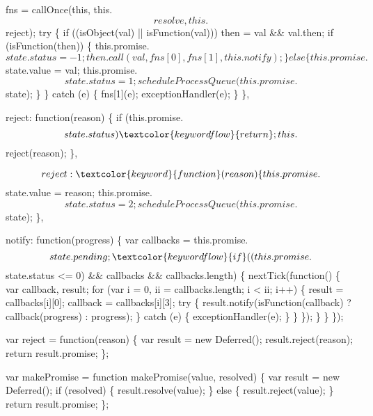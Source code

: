 \begin{DoxyCodeInclude}
{{{{      fns = callOnce(this, this.$$resolve, this.$$reject);
      try \{
        if ((isObject(val) || isFunction(val))) then = val && val.then;
        if (isFunction(then)) \{
          this.promise.$$state.status = -1;
          then.call(val, fns[0], fns[1], this.notify);
        \} else \{
          this.promise.$$state.value = val;
          this.promise.$$state.status = 1;
          scheduleProcessQueue(this.promise.$$state);
        \}
      \} catch (e) \{
        fns[1](e);
        exceptionHandler(e);
      \}
    \},

    reject: \textcolor{keyword}{function}(reason) \{
      \textcolor{keywordflow}{if} (this.promise.$$state.status) \textcolor{keywordflow}{return};
      this.$$reject(reason);
    \},

    $$reject: \textcolor{keyword}{function}(reason) \{
      this.promise.$$state.value = reason;
      this.promise.$$state.status = 2;
      scheduleProcessQueue(this.promise.$$state);
    \},

    notify: \textcolor{keyword}{function}(progress) \{
      var callbacks = this.promise.$$state.pending;

      \textcolor{keywordflow}{if} ((this.promise.$$state.status <= 0) && callbacks && callbacks.length) \{
        nextTick(\textcolor{keyword}{function}() \{
          var callback, result;
          \textcolor{keywordflow}{for} (var i = 0, ii = callbacks.length; i < ii; i++) \{
            result = callbacks[i][0];
            callback = callbacks[i][3];
            try \{
              result.notify(isFunction(callback) ? callback(progress) : progress);
            \} catch (e) \{
              exceptionHandler(e);
            \}
          \}
        \});
      \}
    \}
  \});

  var reject = \textcolor{keyword}{function}(reason) \{
    var result = \textcolor{keyword}{new} Deferred();
    result.reject(reason);
    \textcolor{keywordflow}{return} result.promise;
  \};

  var makePromise = \textcolor{keyword}{function} makePromise(value, resolved) \{
    var result = \textcolor{keyword}{new} Deferred();
    \textcolor{keywordflow}{if} (resolved) \{
      result.resolve(value);
    \} \textcolor{keywordflow}{else} \{
      result.reject(value);
    \}
    \textcolor{keywordflow}{return} result.promise;
  \};

}}}}
\end{DoxyCodeInclude}
